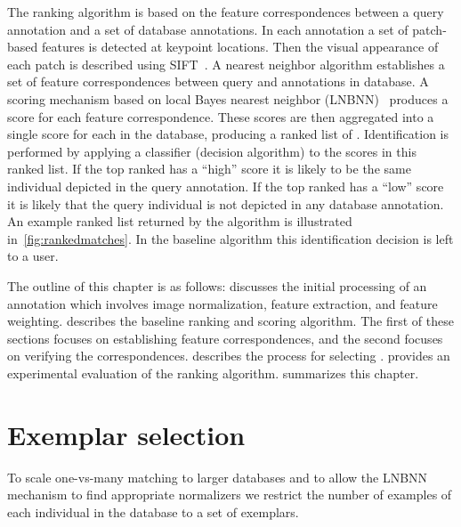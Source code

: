     The ranking algorithm is based on the feature correspondences between a query annotation and a set of database
    annotations. In each annotation a set of patch-based features is detected at keypoint locations. Then the
    visual appearance of each patch is described using SIFT~\cite{lowe_distinctive_2004}. A nearest neighbor
    algorithm establishes a set of feature correspondences between query and annotations in database. A scoring
    mechanism based on local \naive{} Bayes nearest neighbor (LNBNN)~\cite{mccann_local_2012} produces a score for
    each feature correspondence. These scores are then aggregated into a single score for each \name{} in the
    database, producing a ranked list of \names{}. Identification is performed by applying a classifier (decision
    algorithm) to the scores in this ranked list. If the top ranked \name{} has a ``high'' score it is likely to be
    the same individual depicted in the query annotation. If the top ranked \name{} has a ``low'' score it is
    likely that the query individual is not depicted in any database annotation. An example ranked list returned by
    the algorithm is illustrated in~\cref{fig:rankedmatches}. In the baseline algorithm this identification
    decision is left to a user.

    The outline of this chapter is as follows:  discusses the initial processing of an
    annotation which involves image normalization, feature extraction, and feature weighting.
     describes the baseline ranking and scoring algorithm. The first of these
    sections focuses on establishing feature correspondences, and the second focuses on verifying the
    correspondences.  describes the process for selecting \exemplars{}.
     provides an experimental evaluation of the ranking algorithm.
     summarizes this chapter.

    \rankedmatches{}






\section{Exemplar selection}\label{sec:exempselect}
    To scale one-vs-many matching to larger databases and to allow the LNBNN mechanism to find appropriate
    normalizers we restrict the number of examples of each individual in the database to a set of exemplars.

